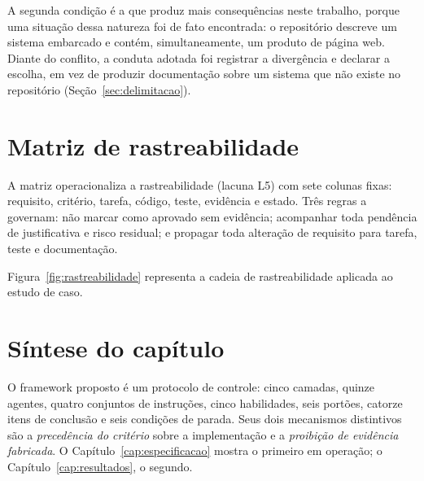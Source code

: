 A segunda condição é a que produz mais consequências neste trabalho, porque uma
situação dessa natureza foi de fato encontrada: o repositório descreve um sistema
embarcado e contém, simultaneamente, um produto de página web. Diante do conflito,
a conduta adotada foi registrar a divergência e declarar a escolha, em vez de
produzir documentação sobre um sistema que não existe no repositório
(Seção~\ref{sec:delimitacao}).

\section{Matriz de rastreabilidade}
\label{sec:fw-rastreabilidade}

A matriz operacionaliza a rastreabilidade (lacuna L5) com sete colunas fixas:
requisito, critério, tarefa, código, teste, evidência e estado. Três regras a
governam: não marcar como aprovado sem evidência; acompanhar toda pendência de
justificativa e risco residual; e propagar toda alteração de requisito para
tarefa, teste e documentação.

Figura~\ref{fig:rastreabilidade} representa a cadeia de rastreabilidade aplicada
ao estudo de caso.



\section{Síntese do capítulo}
\label{sec:fw-sintese}

O framework proposto é um protocolo de controle: cinco camadas, quinze agentes,
quatro conjuntos de instruções, cinco habilidades, seis portões, catorze itens de
conclusão e seis condições de parada. Seus dois mecanismos distintivos são a
\emph{precedência do critério} sobre a implementação e a \emph{proibição de
evidência fabricada}. O Capítulo~\ref{cap:especificacao} mostra o primeiro em
operação; o Capítulo~\ref{cap:resultados}, o segundo.
